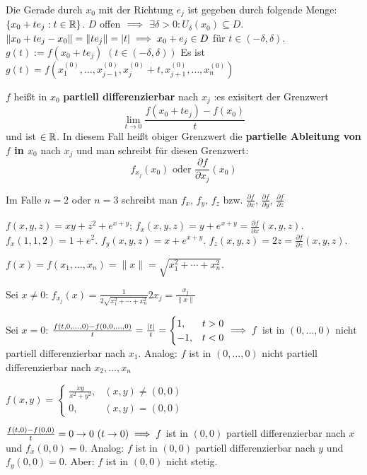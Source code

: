 \documentclass[a4paper,oneside,DIV15,BCOR12mm,chapterprefix=true,headings=onelinechapter]{scrbook}
\begin{document}
Die Gerade durch $x_0$ mit der Richtung $e_j$ ist gegeben durch folgende Menge: $\{x_0+te_j:t\in\mathbb{R}\}$. $D$ offen $\implies$ $\exists\delta>0: U_\delta(x_0)\subseteq D$. $\|x_0+te_j - x_0\| = \|te_j\| = |t| \implies x_0+e_j \in D $ für $t\in(-\delta,\delta)$. $g(t) := f(x_0+te_j)$ $(t\in(-\delta,\delta))$
 Es ist $g(t) = f(x_1^{(0)}, \ldots, x_{j-1}^{(0)}, x_j^{(0)} + t, x_{j+1}^{(0)}, \ldots, x_n^{(0)} )$

\begin{definition}
$f$ heißt in $x_0$ \textbf{partiell differenzierbar} nach $x_j$ :\equizu es exisitert 
der Grenzwert 
$$\lim_{t\to0}\frac{f(x_0+te_j) - f(x_0)}t$$ 
und ist $\in\mathbb{R}$. In diesem Fall heißt obiger Grenzwert die \textbf{partielle Ableitung 
von $f$ in $x_0$} nach $x_j$ und man schreibt für diesen Grenzwert: 
$$f_{x_j}(x_0) \text{ oder }\frac{\partial f}{\partial x_j}(x_0)$$

Im Falle $n=2$ oder $n=3$ schreibt man $f_x$, $f_y$, $f_z$ bzw. $\frac{\partial f}{\partial x}$, $\frac{\partial f}{\partial y}$, $\frac{\partial f}{\partial z}$
\end{definition}


\begin{beispiele}
\item $f(x,y,z) = xy+z^2+e^{x+y}$; $f_x(x,y,z) = y + e^{x+y} = \frac{\partial f}{\partial x}(x,y,z)$. $f_x(1,1,2)=1+e^2$. $f_y(x,y,z) = x+e^{x+y}$. $f_z(x,y,z) = 2z = \frac{\partial f}{\partial z}(x,y,z)$.
\item $f(x) = f(x_1,\ldots, x_n) = \|x\| = \sqrt{x_1^2 + \cdots + x_n^2}$.

Sei $x\ne0$: $f_{x_j}(x) = \frac{1}{2\sqrt{x_1^2 + \cdots + x_n^2}}2x_j = \frac{x_j}{\|x\|} $

Sei $x=0$: $\frac{f(t,0,\ldots,0) - f(0,0,\ldots,0)}{t} = \frac{|t|}{t} = \begin{cases} 1, &t>0\\-1,&t<0\end{cases} \implies f$ ist in $(0,\ldots,0)$ nicht partiell differenzierbar nach $x_1$. Analog: $f$ ist in $(0,\ldots,0)$ nicht partiell differenzierbar nach $x_2,\ldots,x_n$
\item $f(x,y) = \begin{cases} \frac{xy}{x^2+y^2}, &(x,y)\ne(0,0)\\0,&(x,y) = (0,0) \end{cases}$

$\frac{f(t,0) - f(0,0)}{t} = 0 \to 0 \ (t\to0) \folgt f$ ist in $(0,0)$ partiell differenzierbar nach $x$ und $f_x(0,0) = 0$. Analog: $f$ ist in $(0,0)$ partiell differenzierbar nach $y$ und $f_y(0,0) = 0$. Aber: $f$ ist in $(0,0)$ nicht stetig.
\end{beispiele}
\end{document}
